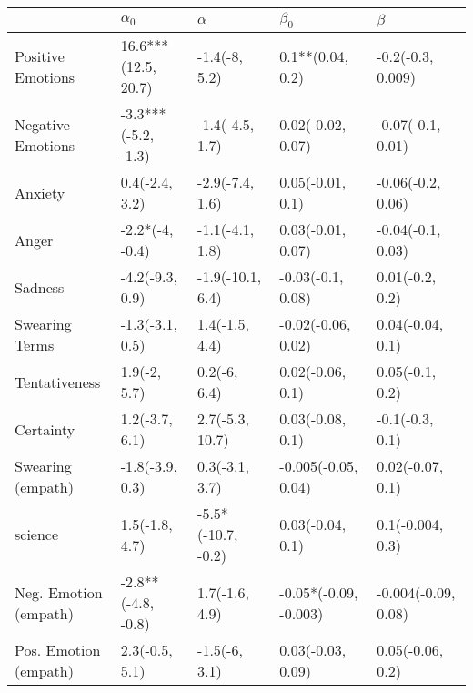 \begin{tabular}{lllll}
\toprule
{} &           $\alpha_0$ &            $\alpha$ &              $\beta_0$ &              $\beta$ \\
\midrule
Positive Emotions     &  16.6***(12.5, 20.7) &       -1.4(-8, 5.2) &       0.1**(0.04, 0.2) &    -0.2(-0.3, 0.009) \\
Negative Emotions     &  -3.3***(-5.2, -1.3) &     -1.4(-4.5, 1.7) &      0.02(-0.02, 0.07) &    -0.07(-0.1, 0.01) \\
Anxiety               &       0.4(-2.4, 3.2) &     -2.9(-7.4, 1.6) &       0.05(-0.01, 0.1) &    -0.06(-0.2, 0.06) \\
Anger                 &      -2.2*(-4, -0.4) &     -1.1(-4.1, 1.8) &      0.03(-0.01, 0.07) &    -0.04(-0.1, 0.03) \\
Sadness               &      -4.2(-9.3, 0.9) &    -1.9(-10.1, 6.4) &      -0.03(-0.1, 0.08) &      0.01(-0.2, 0.2) \\
Swearing Terms        &      -1.3(-3.1, 0.5) &      1.4(-1.5, 4.4) &     -0.02(-0.06, 0.02) &     0.04(-0.04, 0.1) \\
Tentativeness         &         1.9(-2, 5.7) &        0.2(-6, 6.4) &       0.02(-0.06, 0.1) &      0.05(-0.1, 0.2) \\
Certainty             &       1.2(-3.7, 6.1) &     2.7(-5.3, 10.7) &       0.03(-0.08, 0.1) &      -0.1(-0.3, 0.1) \\
Swearing (empath)     &      -1.8(-3.9, 0.3) &      0.3(-3.1, 3.7) &    -0.005(-0.05, 0.04) &     0.02(-0.07, 0.1) \\
science               &       1.5(-1.8, 4.7) &  -5.5*(-10.7, -0.2) &       0.03(-0.04, 0.1) &     0.1(-0.004, 0.3) \\
Neg. Emotion (empath) &   -2.8**(-4.8, -0.8) &      1.7(-1.6, 4.9) &  -0.05*(-0.09, -0.003) &  -0.004(-0.09, 0.08) \\
Pos. Emotion (empath) &       2.3(-0.5, 5.1) &       -1.5(-6, 3.1) &      0.03(-0.03, 0.09) &     0.05(-0.06, 0.2) \\
\bottomrule
\end{tabular}
